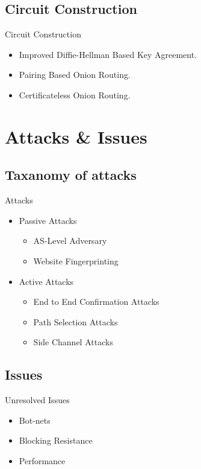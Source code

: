 \documentclass{beamer}
\begin{document}
\subsection{Circuit Construction}
\begin{frame}{Circuit Construction}
\begin{itemize}
   \item Improved Diffie-Hellman Based Key Agreement.
   \item Pairing Based Onion Routing.
   \item Certificateless Onion Routing.
\end{itemize}
\end{frame}

\section{Attacks \& Issues}
\subsection{Taxanomy of attacks}
\begin{frame}{Attacks}
\begin{itemize}
   \item Passive Attacks
   \begin{itemize}
       \item AS-Level Adversary
       \item Website Fingerprinting
       
   \end{itemize}
   \item Active Attacks
   \begin{itemize}
       \item End to End Confirmation Attacks
       \item Path Selection Attacks
       \item Side Channel Attacks
   \end{itemize}
\end{itemize}
\end{frame}



\subsection{Issues}

\begin{frame}{Unresolved Issues}

\begin{itemize}
\item Bot-nets
\item Blocking Resistance
\item Performance
\end{itemize}
\end{frame}
\end{document}
